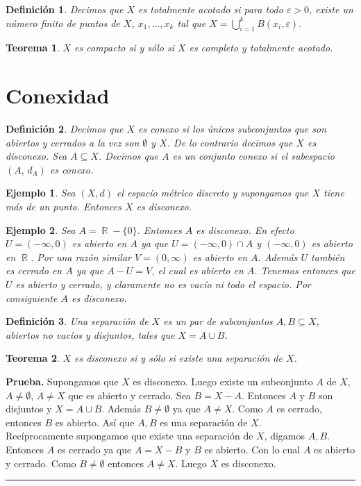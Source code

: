 \documentclass[x11names, 12pt]{book}
\newtheorem{definicion}{Definición}
\newtheorem{teorema}{Teorema}
\newtheorem{example}{Ejemplo}
\newenvironment{prueba}[1][Prueba]{\noindent\textbf{#1.} }{\ \rule{0.5em}{0.5em}}
\DeclareMathOperator{\R}{\mathbb{R}}
\begin{document}
\begin{definicion}
Decimos que $X$ es totalmente acotado si para todo $\varepsilon >0$, existe un número finito de puntos de $X$, $x_1, \dots, x_k$ tal que $X=\bigcup _{i=1}^k B(x_i, \varepsilon).$
\end{definicion}

\begin{teorema}
$X$ es compacto si y sólo si $X$ es completo y totalmente acotado.
\end{teorema}

\section{Conexidad}
 
 \begin{definicion}
 Decimos que $X$ es conexo si los únicos subconjuntos que son abiertos y cerrados a la vez son $\emptyset$ y $X$. De lo contrario decimos que $X$ es disconexo. Sea $A\subseteq X$. Decimos que $A$ es un conjunto conexo si el subespacio $(A,\, d_A)$ es conexo.
 \end{definicion}

\begin{example}
Sea $(X,d)$ el espacio métrico discreto y supongamos que $X$ tiene más de un punto. Entonces $X$ es disconexo.
\end{example}

\begin{example}
Sea $A=\R-\{0\}$. Entonces $A$ es disconexo. En efecto $U=(-\infty , 0)$ es abierto en $A$ ya que \linebreak $U=(-\infty , 0) \cap A$ y $(-\infty , 0)$ es abierto en $\R$. Por una razón similar $V=(0, \infty)$
 es abierto en $A$. Además  $U$ también es cerrado en $A$ ya que $A- U=V$, el cual es abierto en $A$. Tenemos entonces que $U$ es abierto y cerrado, y claramente no es vacío ni todo el espacio. Por consiguiente $A$ es disconexo.
 \end{example}

\begin{definicion}
Una separación de $X$ es un par de subconjuntos $A, B \subseteq X$, abiertos no vacíos y disjuntos, tales que $X=A\cup B$.
\end{definicion}

\begin{teorema}
$X$ es disconexo si y sólo si existe una separación de $X$.
\end{teorema}
\begin{prueba}
Supongamos que $X$ es disconexo. Luego existe un subconjunto $A$ de $X$, $A\neq \emptyset$, $A\neq X$ que es abierto y cerrado. Sea $B=X-A$. Entonces $A$ y $B$ son disjuntos y $X=A\cup B$. Además $B\neq \emptyset$ ya que $A\neq X$. Como $A $ es cerrado, entonces $B$ es abierto. Así que $A,B$ es una separación de $X$.\\
Recíprocamente supongamos que existe una separación de $X$, digamos $A,B$. Entonces $A$ es cerrado ya que $A=X-B$ y $B$ es abierto. Con lo cual $A$ es abierto y cerrado. Como $B\neq \emptyset$ entonces $A \neq X$. Luego $X$ es disconexo.
\end{prueba}
\end{document}
